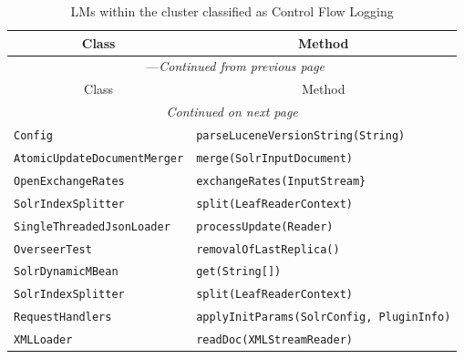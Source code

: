 \begin{center}
\begin{longtable}{ll}
\caption{LMs within the cluster classified as Control Flow Logging}\\
\toprule\multicolumn{1}{c}{Class}&\multicolumn{1}{c}{Method}\\\midrule
\endfirsthead

\multicolumn{2}{c}{\tablename\ \thetable{}---\textit{Continued from previous page}} \\\midrule
\multicolumn{1}{c}{Class}&\multicolumn{1}{c}{Method}\\\midrule
\endhead
\multicolumn{2}{c}{\textit{Continued on next page}}\\\midrule
\endfoot
\bottomrule
\endlastfoot

\lstinline/Config/&{\lstinline/parseLuceneVersionString(String)/}\\
\lstinline/AtomicUpdateDocumentMerger/&{\lstinline/merge(SolrInputDocument)/}\\
\lstinline/OpenExchangeRates/&{\lstinline/exchangeRates(InputStream}/}\\
\lstinline/SolrIndexSplitter/&{\lstinline/split(LeafReaderContext)/}\\
\lstinline/SingleThreadedJsonLoader/&{\lstinline/processUpdate(Reader)/}\\
\lstinline/OverseerTest/&{\lstinline/removalOfLastReplica()/}\\
\lstinline/SolrDynamicMBean/&{\lstinline/get(String[])/}\\
\lstinline/SolrIndexSplitter/&{\lstinline/split(LeafReaderContext)/}\\
\lstinline/RequestHandlers/&{\lstinline/applyInitParams(SolrConfig, PluginInfo)/}\\
\lstinline/XMLLoader/&{\lstinline/readDoc(XMLStreamReader)/}\\
\end{longtable}
\end{center}

